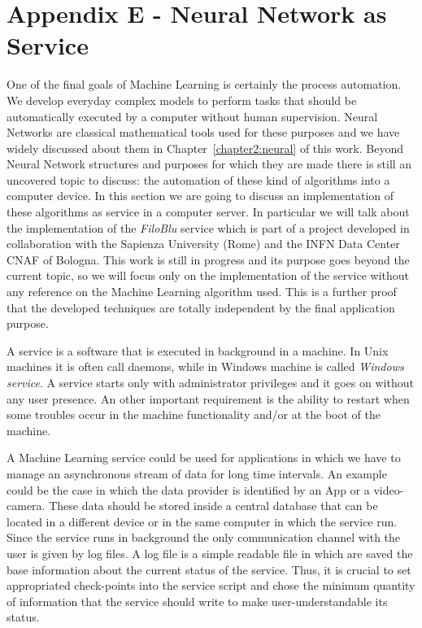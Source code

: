 \documentclass{standalone}
\begin{document}
\chapter*{Appendix E - Neural Network as Service}

One of the final goals of Machine Learning is certainly the process automation.
We develop everyday complex models to perform tasks that should be automatically executed by a computer without human supervision.
Neural Networks are classical mathematical tools used for these purposes and we have widely discussed about them in Chapter~\ref{chapter2:neural} of this work.
Beyond Neural Network structures and purposes for which they are made there is still an uncovered topic to discuss: the automation of these kind of algorithms into a computer device.
In this section we are going to discuss an implementation of these algorithms as service in a computer server.
In particular we will talk about the implementation of the \emph{FiloBlu} service which is part of a project developed in collaboration with the Sapienza University (Rome) and the INFN Data Center CNAF of Bologna.
This work is still in progress and its purpose goes beyond the current topic, so we will focus only on the implementation of the service without any reference on the Machine Learning algorithm used.
This is a further proof that the developed techniques are totally independent by the final application purpose.

A service is a software that is executed in background in a machine.
In Unix machines it is often call \textsf{daemon}s, while in Windows machine is called \emph{Windows service}.
A service starts only with administrator privileges and it goes on without any user presence.
An other important requirement is the ability to restart when some troubles occur in the machine functionality and/or at the boot of the machine.

A Machine Learning service could be used for applications in which we have to manage an asynchronous stream of data for long time intervals.
An example could be the case in which the data provider is identified by an App or a video-camera.
These data should be stored inside a central database that can be located in a different device or in the same computer in which the service run.
Since the service runs in background the only communication channel with the user is given by log files.
A log file is a simple readable file in which are saved the base information about the current status of the service.
Thus, it is crucial to set appropriated check-points into the service script and chose the minimum quantity of information that the service should write to make user-understandable its status.
\end{document}

